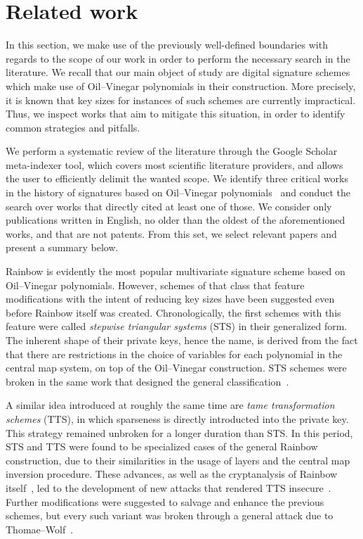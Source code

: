 \documentclass[draft, 12pt, a4paper, oneside]{memoir}
\begin{document}

\section{Related work}\label{sec:related}

In this section, we make use of the previously well-defined boundaries with regards to the scope of our work in order to perform the necessary search in the literature. We recall that our main object of study are digital signature schemes which make use of Oil--Vinegar polynomials in their construction. More precisely, it is known that key sizes for instances of such schemes are currently impractical. Thus, we inspect works that aim to mitigate this situation, in order to identify common strategies and pitfalls.

We perform a systematic review of the literature through the Google Scholar meta-indexer tool, which covers most scientific literature providers, and allows the user to efficiently delimit the wanted scope. We identify three critical works in the history of signatures based on Oil--Vinegar polynomials~\cite{Patarin:199709,Kipnis:199904,Ding:200506} and conduct the search over works that directly cited at least one of those. We consider only publications written in English, no older than the oldest of the aforementioned works, and that are not patents. From this set, we select relevant papers and present a summary below.

Rainbow is evidently the most popular multivariate signature scheme based on Oil--Vinegar polynomials. However, schemes of that class that feature modifications with the intent of reducing key sizes have been suggested even before Rainbow itself was created. Chronologically, the first schemes with this feature were called \emph{stepwise triangular systems} (STS) in their generalized form. The inherent shape of their private keys, hence the name, is derived from the fact that there are restrictions in the choice of variables for each polynomial in the central map system, on top of the Oil--Vinegar construction. STS schemes were broken in the same work that designed the general classification~\cite{}.

A similar idea introduced at roughly the same time are \emph{tame transformation schemes} (TTS), in which sparseness is directly introducted into the private key. This strategy remained unbroken for a longer duration than STS. In this period, STS and TTS were found to be specialized cases of the general Rainbow construction, due to their similarities in the usage of layers and the central map inversion procedure. These advances, as well as the cryptanalysis of Rainbow itself~\cite{}, led to the development of new attacks that rendered TTS insecure~\cite{}. Further modifications were suggested to salvage and enhance the previous schemes, but every such variant was broken through a general attack due to Thomae--Wolf~\cite{}.
\end{document}
